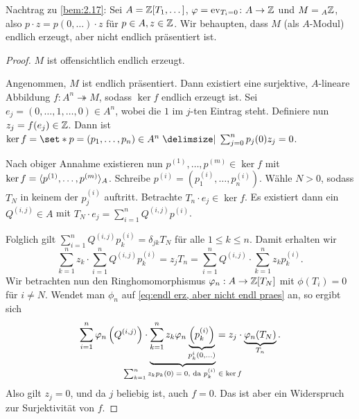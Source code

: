 \documentclass[12pt,a4paper]{scrartcl}
\theoremstyle{cplain}
\theoremstyle{cdef}
\begin{document}
Nachtrag zu \cref{bem:2.17}: Sei $A = \mathbb Z[T_1,\dots]$, $\varphi = \operatorname{ev}_{T_i = 0}\colon A\to \mathbb Z$ und $M = {}_A\mathbb Z$, also $p\cdot z = p(0,\dots)\cdot z$ für $p\in A, z\in\mathbb Z$. Wir behaupten, dass $M$ (als $A$-Modul) endlich erzeugt, aber nicht endlich präsentiert ist.
\begin{proof}
	$M$ ist offensichtlich endlich erzeugt.
	
	Angenommen, $M$ ist endlich präsentiert. Dann existiert eine surjektive, $A$-lineare Abbildung $ f\colon A^n \twoheadrightarrow M$, sodass $\ker f$ endlich erzeugt ist.
	Sei $e_j = (0,\dots, 1,\dots, 0)\in A^n$, wobei die $1$ im $j$-ten Eintrag steht. Definiere nun $z_j = f(e_j)\in\mathbb Z$. Dann ist $\ker f = \set*{ p = (p_1,\dots, p_n)\in A^n \given \sum_{j=0}^n p_j(0)z_j = 0 }$.
	
	Nach obiger Annahme existieren nun $p^{(1)},\dots, p^{(m)}\in\ker f$ mit $\operatorname{ker} f = \langle p^{(1)},\dots, p^{(m)}\rangle_A$. Schreibe $p^{(i)} = \left(p_1^{(i)},\dots,p_n^{(i)}\right)$. Wähle $N>0$, sodass $T_N$ in keinem der $p_j^{(i)}$ auftritt. Betrachte $T_n\cdot e_j\in\ker f$. Es existiert dann ein $Q^{(i,j)}\in A$ mit $T_N\cdot e_j = \sum_{i = 1}^nQ^{(i,j)}p^{(i)}$.
	
	Folglich gilt $\sum_{i = 1}^n Q^{(i,j)}p_k^{(i)} = \delta_{jk}T_N$ für alle $1 \le k \le n$. Damit erhalten wir
	\begin{equation}
		\sum_{k=1}^n z_k \cdot \sum_{i=1}^n Q^{(i,j)} p_k^{(i)} = z_jT_n = \sum_{i=1}^nQ^{(i,j)} \cdot \sum_{k =1}^n z_kp_k^{(i)}.	\tag{*}\label{eq:endl erz, aber nicht endl praes}
	\end{equation}
	Wir betrachten nun den Ringhomomorphismus $\varphi_n : A \to \mathbb Z[T_N]$ mit $\phi(T_i) = 0$ für $i \neq N$. Wendet man $\phi_n$ auf \eqref{eq:endl erz, aber nicht endl praes} an, so ergibt sich
	\begin{align*}
		\sum_{i=1}^n \phi_n\left(Q^{(i,j)}\right) \cdot \underbrace{\sum_{k=1}^nz_k \phi_n\underbrace{\left(p_k^{(i)}\right)}_{p_k^{i}(0,\ldots)}}_{\mathclap{\text{$\sum_{k=1}^nz_kp_k(0) = 0$, da $p_k^{(i)} \in \ker f$}}} = z_j \cdot \underbrace{\phi_n(T_N)}_{T_n}.
	\end{align*}
	Also gilt $z_j = 0$, und da $j$ beliebig ist, auch $f=0$. Das ist aber ein Widerspruch zur Surjektivität von $f$.
\end{proof}
\end{document}
